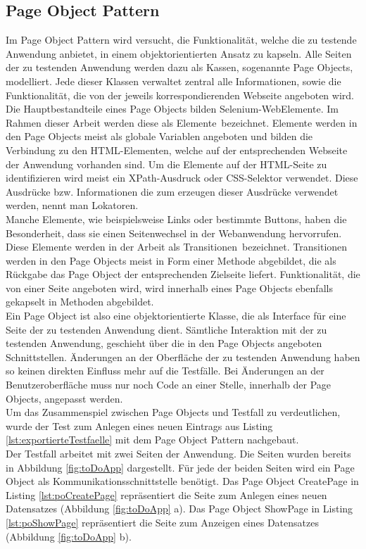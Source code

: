 \subsection{Page Object Pattern}
\label{sec:page_object_pattern}
Im Page Object Pattern wird versucht, die Funktionalität, welche die zu testende Anwendung anbietet, in einem objektorientierten Ansatz zu kapseln.
Alle Seiten der zu testenden Anwendung werden dazu als Kassen, sogenannte Page Objects, modelliert. Jede dieser Klassen verwaltet zentral alle Informationen, sowie die Funktionalität, die von der jeweils korrespondierenden Webseite angeboten wird. Die Hauptbestandteile eines Page Objects bilden Selenium-WebElemente. Im Rahmen dieser Arbeit werden diese als \grq Elemente\grq\ bezeichnet. Elemente werden in den Page Objects meist als globale Variablen angeboten und bilden die Verbindung zu den HTML-Elementen, welche auf der entsprechenden Webseite der Anwendung vorhanden sind.
Um die Elemente auf der HTML-Seite zu identifizieren wird meist ein XPath-Ausdruck oder CSS-Selektor verwendet. Diese Ausdrücke bzw. Informationen die zum erzeugen dieser Ausdrücke verwendet werden, nennt man \grq Lokatoren\grq.\\ 
Manche Elemente, wie beispielsweise Links oder bestimmte Buttons, haben die Besonderheit, dass sie einen Seitenwechsel in der Webanwendung hervorrufen. Diese Elemente werden in der Arbeit als \grq Transitionen\grq\ bezeichnet. Transitionen werden in den Page Objects meist in Form einer Methode abgebildet, die als Rückgabe das Page Object der entsprechenden Zielseite liefert. Funktionalität, die von einer Seite angeboten wird, wird innerhalb eines Page Objects ebenfalls gekapselt in Methoden abgebildet.\\
Ein Page Object ist also eine objektorientierte Klasse, die als Interface für eine Seite der zu testenden Anwendung dient.
Sämtliche Interaktion mit der zu testenden Anwendung, geschieht über die in den Page Objects angeboten Schnittstellen.
Änderungen an der Oberfläche der zu testenden Anwendung haben so keinen direkten Einfluss mehr auf die Testfälle. Bei Änderungen an der Benutzeroberfläche muss nur noch Code an einer Stelle, innerhalb der Page Objects, angepasst werden.\\
Um das Zusammenspiel zwischen Page Objects und Testfall zu verdeutlichen, wurde der Test zum Anlegen eines neuen Eintrags aus Listing \ref{lst:exportierteTestfaelle} mit dem Page Object Pattern nachgebaut.\\
Der Testfall arbeitet mit zwei Seiten der Anwendung. Die Seiten wurden bereits in Abbildung \ref{fig:toDoApp} dargestellt. Für jede der beiden Seiten wird ein Page Object als Kommunikationsschnittstelle benötigt. 
Das Page Object CreatePage in Listing \ref{lst:poCreatePage} repräsentiert die Seite zum Anlegen eines neuen Datensatzes (Abbildung \ref{fig:toDoApp} a). Das Page Object ShowPage in Listing \ref{lst:poShowPage} repräsentiert die Seite zum Anzeigen eines Datensatzes (Abbildung \ref{fig:toDoApp} b).

